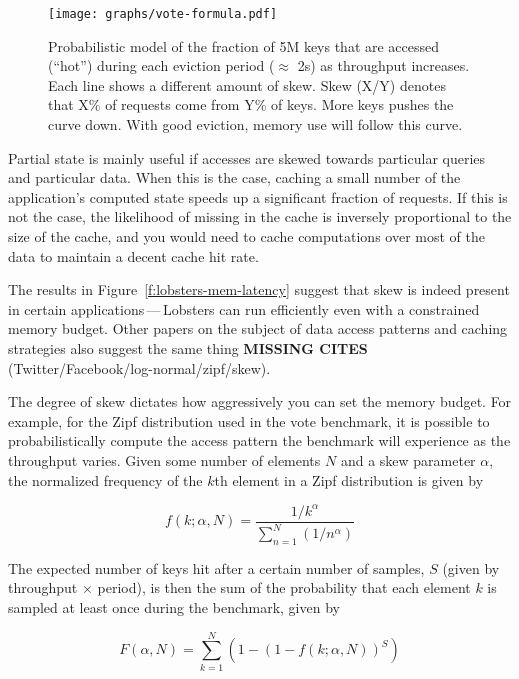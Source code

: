 \begin{figure}[h]
  \centering
  \texttt{[image: graphs/vote-formula.pdf]}
  \caption{Probabilistic model of the fraction of 5M keys that are accessed
  (``hot'') during each eviction period ($\approx$ 2s) as throughput increases.
  Each line shows a different amount of skew. Skew (X/Y) denotes that X\% of
  requests come from Y\% of keys. More keys pushes the curve down. With good
  eviction, memory use will follow this curve.}
  \label{f:vote-formula}
\end{figure}

Partial state is mainly useful if accesses are skewed towards particular queries
and particular data. When this is the case, caching a small number of the
application's computed state speeds up a significant fraction of requests. If
this is not the case, the likelihood of missing in the cache is inversely
proportional to the size of the cache, and you would need to cache computations
over most of the data to maintain a decent cache hit rate.

The results in Figure~\ref{f:lobsters-mem-latency} suggest that skew is indeed
present in certain applications\,---\,Lobsters can run efficiently even with a
constrained memory budget. Other papers on the subject of data access patterns
and caching strategies also suggest the same thing \textbf{MISSING CITES}
(Twitter/Facebook/log-normal/zipf/skew).

The degree of skew dictates how aggressively you can set the memory budget.
For example, for the Zipf distribution used in the vote benchmark, it is
possible to probabilistically compute the access pattern the benchmark will
experience as the throughput varies. Given some number of elements $N$ and a
skew parameter $\alpha$, the normalized frequency of the $k$th element in a Zipf
distribution is given by

\begin{displaymath}
  f(k;\alpha,N)={\frac {1/k^{\alpha}}{\sum \limits _{n=1}^{N}(1/n^{\alpha})}}
\end{displaymath}

The expected number of keys hit after a certain number of samples, $S$ (given by
throughput $\times$ period), is then the sum of the probability that each
element $k$ is sampled at least once during the benchmark, given by

\begin{displaymath}
  F(\alpha,N)={\sum \limits _{k=1}^{N} \left(1 - \left(1 - f(k; \alpha, N)\right)^{S}\right)}
\end{displaymath}

